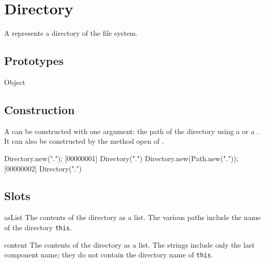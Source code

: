 \section{Directory}

A  represents a directory of the file system.

\subsection{Prototypes}
\begin{refObjects}
\item[Object]
\end{refObjects}

\subsection{Construction}

A  can be constructed with one argument: the path of
the directory using a  or a . It can
also be constructed by the method open of .

\begin{urbiscript}[firstnumber=1]
Directory.new(".");
[00000001] Directory(".")
Directory.new(Path.new("."));
[00000002] Directory(".")
\end{urbiscript}

\subsection{Slots}
\begin{urbiscriptapi}
\item[asList]
  The contents of the directory as a  list.  The
  various paths include the name of the directory \lstinline|this|.

\item[content]
  The contents of the directory as a  list.  The
  strings include only the last component name; they do not contain
  the directory name of \lstinline|this|.
\end{urbiscriptapi}


